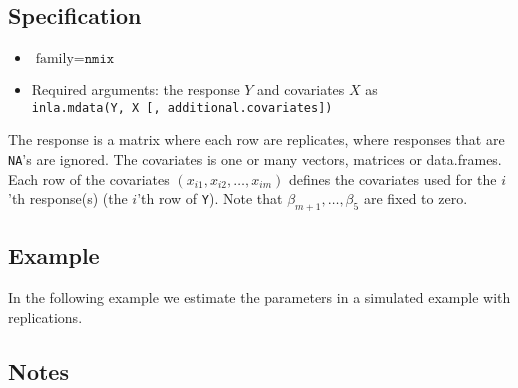 \documentclass[a4paper,11pt]{article}
\def\mmax{5}
\begin{document}
\subsection*{Specification}

\begin{itemize}
\item $\text{family}=\texttt{nmix}$
\item Required arguments: the response $Y$ and covariates $X$ as\\
    \verb|inla.mdata(Y, X [, additional.covariates])|
\end{itemize}
The response is a matrix where each row are replicates, where
responses that are \texttt{NA}'s are ignored. The covariates is one or
many vectors, matrices or data.frames. Each row of the covariates
$(x_{i1}, x_{i2}, \ldots, x_{im})$ defines the covariates used for the
$i$'th response(s) (the $i$'th row of \texttt{Y}). Note that 
$\beta_{m+1}, \ldots, \beta_{\mmax}$ are fixed to zero.


\subsection*{Example}

In the following example we estimate the parameters in a simulated
example with replications.


\subsection*{Notes}
\end{document}
